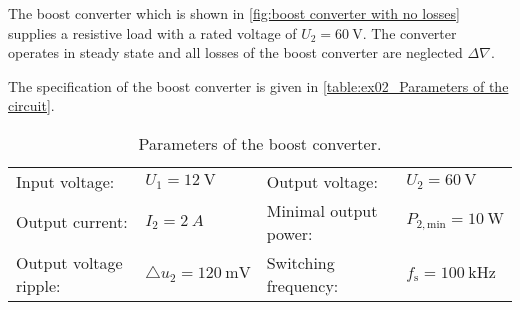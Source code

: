 

The boost converter which is shown in \autoref{fig:boost converter with no losses} supplies a resistive load with a rated voltage of $U_{\mathrm{2}} = \SI{60}{\volt}$. The converter operates in steady state and all losses of the boost converter are neglected $\Delta \nabla$.



The specification of the boost converter is given in \autoref{table:ex02_Parameters of the circuit}.

\begin{table}[ht]
    \centering  %
    \begin{tabular}{llll}
        \toprule
        
        Input voltage: &  $U_{\mathrm{1}} = \SI{12}{\volt}$ & Output voltage: & $U_{\mathrm{2}} = \SI{60}{\volt}$ \\ 
        Output current: & $I_2 = \SI{2}{A}$  & Minimal output power: & $P_{\mathrm{2,min}} = \SI{10}{\watt}$ \\ 
        Output voltage ripple: & $\triangle u_{\mathrm{2}} = \SI{120}{\milli\volt}$  & Switching frequency: & $f_{\mathrm{s}} = \SI{100}{\kilo\hertz}$ \\ 
        \bottomrule
    \end{tabular}
    \caption{Parameters of the boost converter.}  %
    \label{table:ex02_Parameters of the circuit}
\end{table}
%


